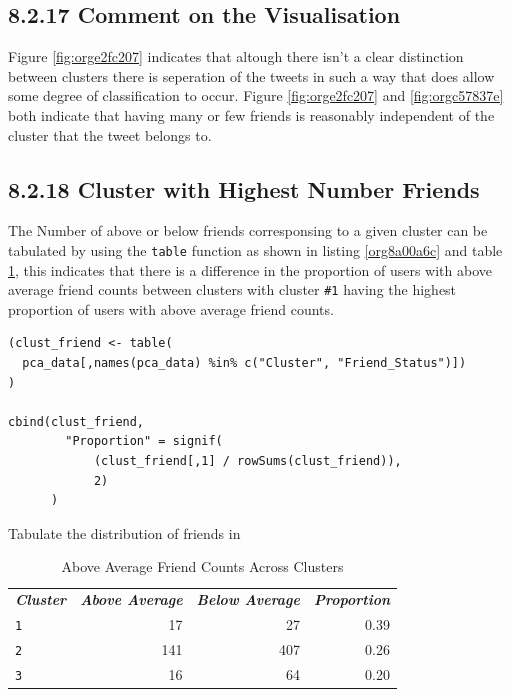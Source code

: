 \documentclass[11pt]{article}
\begin{document}
\subsection{8.2.17 Comment on the Visualisation}
\label{sec:org1959890}
Figure \ref{fig:orge2fc207} indicates that altough there isn't a clear distinction between
clusters there is seperation of the tweets in such a way that does allow some
degree of classification to occur. Figure \ref{fig:orge2fc207} and \ref{fig:orgc57837e} both indicate that having
many or few friends is reasonably independent of the cluster that the tweet
belongs to.
\subsection{8.2.18 Cluster with Highest Number Friends}
\label{sec:org5469a94}
The Number of above or below friends corresponsing to a given cluster can be tabulated by using the \texttt{table} function as shown in listing \ref{org8a00a6c} and table \ref{tab:org623c710}, this indicates that there is a difference in the proportion of users with above average friend counts between clusters with cluster \texttt{\#1} having the highest proportion of users with above average friend counts.

\begin{listing}[htbp]
\begin{verbatim}
(clust_friend <- table(
  pca_data[,names(pca_data) %in% c("Cluster", "Friend_Status")])
)

cbind(clust_friend,
        "Proportion" = signif(
            (clust_friend[,1] / rowSums(clust_friend)),
            2)
      )
\end{verbatim}
\caption{\label{org8a00a6c}Tabulate the distribution of friends in}
\end{listing}

\begin{table}[htbp]
\caption{\label{tab:org623c710}Above Average Friend Counts Across Clusters}
\centering
\begin{tabular}{lrrr}
\textbf{\emph{Cluster}} & \textbf{\emph{Above Average}} & \textbf{\emph{Below Average}} & \textbf{\emph{Proportion}}\\
\texttt{1} & 17 & 27 & 0.39\\
\texttt{2} & 141 & 407 & 0.26\\
\texttt{3} & 16 & 64 & 0.20\\
\end{tabular}
\end{table}
\end{document}
